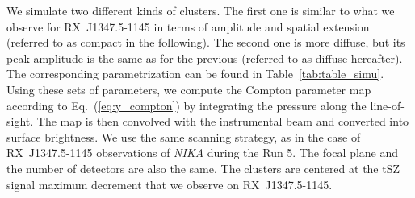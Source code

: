 We simulate two different kinds of clusters. The first one is similar to what we observe for \mbox{RX~J1347.5-1145} in terms of amplitude and spatial extension (referred to as compact in the following). The second one is more diffuse, but its peak amplitude is the same as for the previous (referred to as diffuse hereafter). The corresponding parametrization can be found in Table~\ref{tab:table_simu}. Using these sets of parameters, we compute the Compton parameter map according to Eq.~(\ref{eq:y_compton}) by integrating the pressure along the line-of-sight. The map is then convolved with the instrumental beam and converted into surface brightness. We use the same scanning strategy, as in the case of \mbox{RX~J1347.5-1145} observations of {\it NIKA} during the Run 5. The focal plane and the number of detectors are also the same. The clusters are centered at the tSZ signal maximum decrement that we observe on \mbox{RX~J1347.5-1145}.

